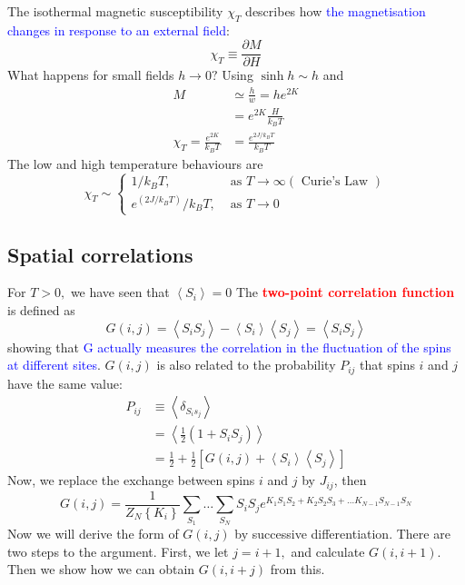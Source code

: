 \documentclass[12pt,titlepage]{article}
\numberwithin{equation}{section}
\begin{document}
The isothermal magnetic susceptibility $\chi_{T}$ describes how \textcolor{blue}{the magnetisation changes in response to an external field}:
\begin{equation}
\chi_{T} \equiv \frac{\partial M}{\partial H}
\end{equation}
What happens for small fields $h \rightarrow 0 ?$ Using $\sinh h \sim h$ and
\begin{equation}
\begin{aligned} M & \simeq \frac{h}{w}=h e^{2 K} \\ &=e^{2 K} \frac{H}{k_{B} T} \\ \chi_{T}=\frac{e^{2 K}}{k_{B} T} &=\frac{e^{2 J / k_{B} T}}{k_{B} T} \end{aligned}
\end{equation}
The low and high temperature behaviours are
\begin{equation}
\chi_{T} \sim\left\{\begin{array}{ll}{1 / k_{B} T,} & {\text { as } T \rightarrow \infty(\text { Curie's Law })} \\ {e^{\left(2 J / k_{B} T\right)} / k_{B} T,} & {\text { as } T \rightarrow 0}\end{array}\right.
\end{equation}
\subsection{Spatial correlations}
For $T>0,$ we have seen that $\left\langle S_{i}\right\rangle= 0$ The \textcolor{red}{\textbf{two-point correlation function}} is defined as
\begin{equation}
G(i, j)=\left\langle S_{i} S_{j}\right\rangle-\left\langle S_{i}\right\rangle\left\langle S_{j}\right\rangle=\left\langle S_{i} S_{j}\right\rangle
\end{equation}
showing that \textcolor{blue}{G actually measures the correlation in the fluctuation of the spins at different sites}. $G(i, j)$ is also related to the probability $P_{i j}$ that spins $i$ and $j$ have the same value:
\begin{equation}
\begin{aligned} P_{i j} & \equiv\left\langle\delta_{S_{i} s_{j}}\right\rangle \\ &=\left\langle\frac{1}{2}\left(1+S_{i} S_{j}\right)\right\rangle \\ &=\frac{1}{2}+\frac{1}{2}\left[G(i, j)+\left\langle S_{i}\right\rangle\left\langle S_{j}\right\rangle\right] \end{aligned}
\end{equation}
Now, we replace the exchange between spins $i$ and $j$ by $J_{i j}$, then
\begin{equation}
G(i, j)=\frac{1}{Z_{N}\left\{K_{i}\right\}} \sum_{S_{1}} \ldots \sum_{S_{N}} S_{i} S_{j} e^{K_{1} S_{1} S_{2}+K_{2} S_{2} S_{3}+\ldots K_{N-1} S_{N-1} S_{N}}
\end{equation}
Now we will derive the form of $G(i, j)$ by successive differentiation. There are two steps to the argument. First, we let $j=i+1,$ and calculate $G(i, i+1) .$ Then we show how we can obtain $G(i, i+j)$ from this.
 
\end{document}
